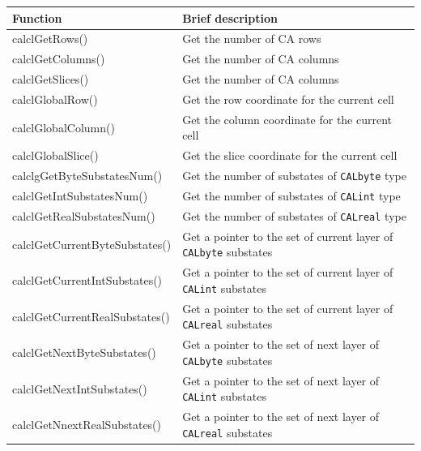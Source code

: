 \begin{table}
  \centering
  \begin{footnotesize}
  \begin{tabular}{l|l}
    \hline
    Function & Brief description\\
    \hline
    \hline
    calclGetRows()                 & Get the number of CA rows \\
    calclGetColumns()              & Get the number of CA columns \\
    calclGetSlices()               & Get the number of CA columns \\
    calclGlobalRow()               & Get the row coordinate for the current cell \\
    calclGlobalColumn()            & Get the column coordinate for the current cell \\
    calclGlobalSlice()             & Get the slice coordinate for the current cell \\
    calclgGetByteSubstatesNum()    & Get the number of substates of \verb'CALbyte' type \\
    calclGetIntSubstatesNum()      & Get the number of substates of \verb'CALint' type \\
    calclGetRealSubstatesNum()     & Get the number of substates of \verb'CALreal' type \\
    calclGetCurrentByteSubstates() & Get a pointer to the set of current layer of \verb'CALbyte' substates \\
    calclGetCurrentIntSubstates()  & Get a pointer to the set of current layer of \verb'CALint' substates \\
    calclGetCurrentRealSubstates() & Get a pointer to the set of current layer of \verb'CALreal' substates \\
    calclGetNextByteSubstates()    & Get a pointer to the set of next layer of \verb'CALbyte' substates \\
    calclGetNextIntSubstates()     & Get a pointer to the set of next layer of \verb'CALint' substates \\
    calclGetNnextRealSubstates()   & Get a pointer to the set of next layer of \verb'CALreal' substates \\

\end{tabular}
\end{footnotesize}
\end{table}
